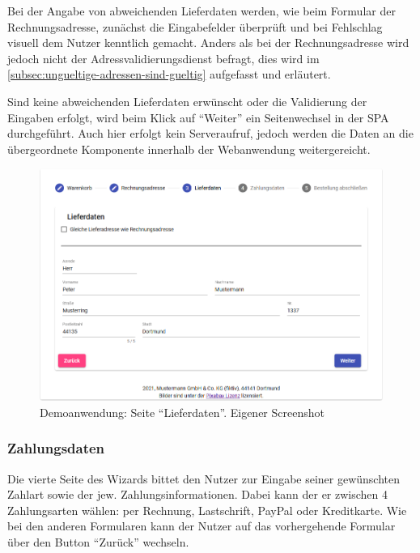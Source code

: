 Bei der Angabe von abweichenden Lieferdaten werden, wie beim Formular der Rechnungsadresse, zunächst die Eingabefelder überprüft und bei Fehlschlag visuell dem Nutzer kenntlich gemacht. Anders als bei der Rechnungsadresse wird jedoch nicht der Adressvalidierungsdienst befragt, dies wird im \autoref{subsec:ungueltige-adressen-sind-gueltig} aufgefasst und erläutert.

Sind keine abweichenden Lieferdaten erwünscht oder die Validierung der Eingaben erfolgt, wird beim Klick auf \enquote{Weiter} ein Seitenwechsel in der SPA durchgeführt. Auch hier erfolgt kein Serveraufruf, jedoch werden die Daten an die übergeordnete Komponente innerhalb der Webanwendung weitergereicht.

\begin{figure}[H]
	\centering
	\includegraphics[width=1.00\linewidth]{img/04_erstellung-poc/demoanwendung_vorstellung_03-lieferdaten.png}
	\caption{Demoanwendung: Seite \enquote{Lieferdaten}. Eigener Screenshot}
	\label{fig:demoanwendung_vorstellung_03-lieferdaten}
\end{figure}

\subsubsection{Zahlungsdaten}

Die vierte Seite des Wizards bittet den Nutzer zur Eingabe seiner gewünschten Zahlart sowie der jew. Zahlungsinformationen. Dabei kann der er zwischen 4 Zahlungsarten wählen: per Rechnung, Lastschrift, PayPal oder Kreditkarte. Wie bei den anderen Formularen kann der Nutzer auf das vorhergehende Formular über den Button \enquote{Zurück} wechseln.

